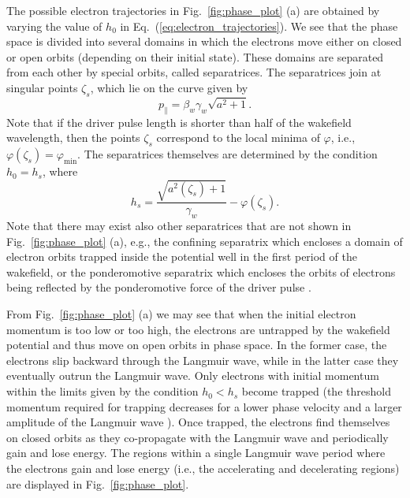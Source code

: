 \documentclass[10pt, a4paper, twoside, openright]{report}
\begin{document}
The possible electron trajectories in Fig.~\ref{fig:phase_plot} (a) are obtained by varying the value of $ h_0 $ in Eq.~(\ref{eq:electron_trajectories}). We see that the phase space is divided into several domains in which the electrons move either on closed or open orbits (depending on their initial state). These domains are separated from each other by special orbits, called separatrices. The separatrices join at singular points $ \zeta_s $, which lie on the curve given by \cite{Esirkepov2006}
\begin{equation}\label{eq:singular_points}
	p_{\parallel} = \beta_w \gamma_w \sqrt{a^2 + 1}.
\end{equation}
Note that if the driver pulse length is shorter than half of the wakefield wavelength, then the points $ \zeta_s $ correspond to the local minima of $ \varphi $, i.e., $ \varphi \left( \zeta_s \right) = \varphi_{\mathrm{min}} $. The separatrices themselves are determined by the condition $ h_0 = h_s $, where \cite{Esirkepov2006, Schroeder2006, Esarey2009}
\begin{equation}\label{eq:separatrix}
	h_s = \frac{\sqrt{a^2 \left( \zeta_{s} \right) + 1}}{\gamma_w} - \varphi \left( \zeta_{s} \right).
\end{equation}
Note that there may exist also other separatrices that are not shown in Fig.~\ref{fig:phase_plot} (a), e.g., the confining separatrix which encloses a domain of electron orbits trapped inside the potential well in the first period of the wakefield, or the ponderomotive separatrix which encloses the orbits of electrons being reflected by the ponderomotive force of the driver pulse \cite{Esirkepov2006}.

From Fig.~\ref{fig:phase_plot} (a) we may see that when the initial electron momentum is too low or too high, the electrons are untrapped by the wakefield potential and thus move on open orbits in phase space. In the former case, the electrons slip backward through the Langmuir wave, while in the latter case they eventually outrun the Langmuir wave. Only electrons with initial momentum within the limits given by the condition $ h_0 < h_s $ become trapped (the threshold momentum required for trapping decreases for a lower phase velocity and a larger amplitude of the Langmuir wave \cite{Schroeder2006}). Once trapped, the electrons find themselves on closed orbits as they co-propagate with the Langmuir wave and periodically gain and lose energy. The regions within a single Langmuir wave period where the electrons gain and lose energy (i.e., the accelerating and decelerating regions) are displayed in Fig.~\ref{fig:phase_plot}. 
\end{document}
